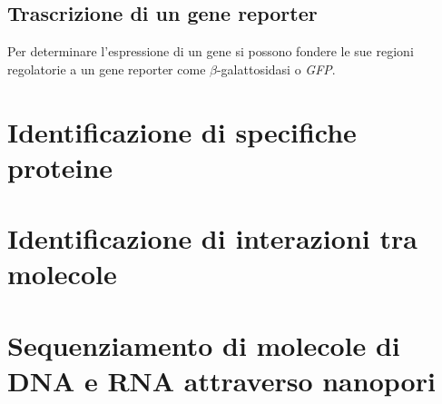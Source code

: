 	\subsection{Trascrizione di un gene reporter}
	Per determinare l'espressione di un gene si possono fondere le sue regioni regolatorie a un gene reporter come $\beta$-galattosidasi o \emph{GFP}.

\section{Identificazione di specifiche proteine}

\section{Identificazione di interazioni tra molecole}

\section{Sequenziamento di molecole di DNA e RNA attraverso nanopori}

